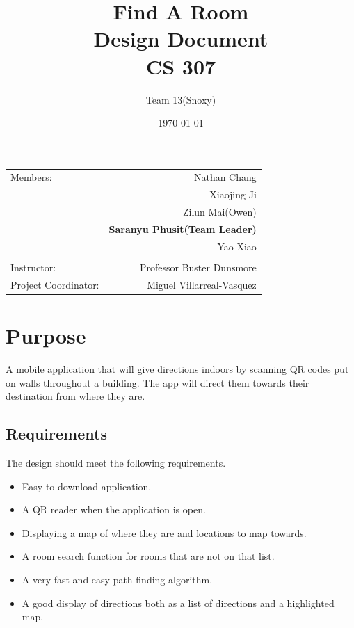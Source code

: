 \documentclass[12pt]{article}
\title{\textbf{Find A Room} \\ Design Document \\ CS 307} %
\author{Team \textsc{13}(Snoxy)} %
\date{\today} %
\begin{document}
\maketitle %

\begin{center}
\begin{tabular}{l r}
Members: & Nathan Chang \\ %
& Xiaojing Ji \\
& Zilun Mai(Owen) \\
& \textbf{Saranyu Phusit(Team Leader)} \\
& Yao Xiao \\
\\
\bigskip
Instructor: & Professor Buster Dunsmore \\%
Project Coordinator: & Miguel Villarreal-Vasquez %

\end{tabular}
\end{center}

\newpage
\tableofcontents




\newpage
\section{Purpose}

A mobile application that will give directions indoors by scanning QR codes put on walls throughout a building. The app will direct them towards their destination from where they are.

\subsection{Requirements}
The design should meet the following requirements.

\begin{itemize}
\item Easy to download application. 
\item A QR reader when the application is open.
\item Displaying a map of where they are and locations to map towards.
\item A room search function for rooms that are not on that list.
\item A very fast and easy path finding algorithm.
\item A good display of directions both as a list of directions and a highlighted map.
\end{itemize}
\end{document}
